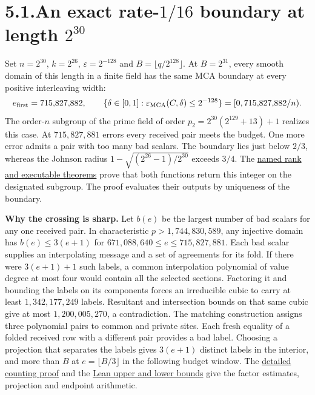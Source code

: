 \documentclass[11pt,letterpaper]{article}
\begin{document}
\section*{5.1.\quad An exact rate-$1/16$ boundary at length $2^{30}$}
Set $n=2^{30}$, $k=2^{26}$, $\varepsilon=2^{-128}$ and $B=\lfloor q/2^{128}\rfloor$.
At $B=2^{31}$, every smooth domain of this length in a finite field has the same
MCA boundary at every positive interleaving width:
\[
   e_{\rm first}=715{,}827{,}882,\qquad
   \{\delta\in[0,1]:\varepsilon_{\rm MCA}(C,\delta)\le2^{-128}\}
     =[0,715{,}827{,}882/n).
\]
The order-$n$ subgroup of the prime field of order $p_2=2^{30}(2^{129}+13)+1$ realizes
this case. At $715{,}827{,}881$ errors every received pair meets the budget. One more
error admits a pair with too many bad scalars. The boundary lies just below $2/3$,
whereas the Johnson radius $1-\sqrt{(2^{26}-1)/2^{30}}$ exceeds $3/4$.
The \href{https://github.com/SlopDotCash/proximityprize/blob/3c392c0ac2faf4c2931a5a8952826a65bec5026d/ArkLib/Research/ProximityGap/SecondPrimeRankReview.lean}{named rank and executable theorems} prove that both functions return this integer on the designated subgroup. The proof evaluates their outputs by uniqueness of the boundary.

\textbf{Why the crossing is sharp.}
Let $b(e)$ be the largest number of bad scalars for any one received pair.
In characteristic $p>1{,}744{,}830{,}589$, any injective domain has
$b(e)\le3(e+1)$ for $671{,}088{,}640\le e\le715{,}827{,}881$.
Each bad scalar supplies an interpolating message and a set of agreements for its fold.
If there were $3(e+1)+1$ such labels, a common interpolation polynomial of value
degree at most four would contain all the selected sections. Factoring it and bounding
the labels on its components forces an irreducible cubic to carry at least
$1{,}342{,}177{,}249$ labels. Resultant and intersection bounds on that same cubic
give at most $1{,}200{,}005{,}270$, a contradiction.
The matching construction assigns three polynomial pairs to common and private sites.
Each fresh equality of a folded received row with a different pair provides a bad label.
Choosing a projection that separates the labels gives $3(e+1)$ distinct labels in the
interior, and more than $B$ at $e=\lfloor B/3\rfloor$ in the following budget window.
The \href{https://github.com/SlopDotCash/proximityprize/blob/797227d570944e033c0af8fc9fff22e4be8f7e7c/docs/research/proximity-gap/second-prime-exact-threshold.md}{detailed counting proof} and the \href{https://github.com/SlopDotCash/proximityprize/blob/797227d570944e033c0af8fc9fff22e4be8f7e7c/ArkLib/Research/ProximityGap/Frontier/UniversalCubicBudgetWindow.lean}{Lean upper and lower bounds} give the factor estimates, projection and endpoint arithmetic.
\end{document}
